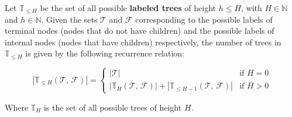   \begin{lemma}
    Let \(\mathbb{T}_{\leq H}\) be the set of all possible \textbf{labeled 
    trees} of height \(h \leq H\), with \(H \in \mathbb{N}\) and \(h \in 
    \mathbb{N}\).
    Given the sets \(\mathcal{T}\) and \(\mathcal{F}\) corresponding to the
    possible labels of terminal nodes (nodes that do not have children) and the 
    possible labels of internal nodes (nodes that have children) respectively,
    the number of trees in \(\mathbb{T}_{\leq H}\) is given by the following
    recurrence relation:

    \begin{equation}
      \label{eq:genetic_programming:representation:cardinality}
      |\mathbb{T}_{\leq H}(\mathcal{T},\, \mathcal{F})| = \begin{cases}
        |\mathcal{T}| 
          & \text{if } H = 0 \\
        |\mathbb{T}_{H}(\mathcal{T},\, \mathcal{F})| 
            + |\mathbb{T}_{\leq H - 1}(\mathcal{T},\, \mathcal{F})|
          & \text{if } H > 0
      \end{cases}
    \end{equation}

    Where \(\mathbb{T}_{H}\) is the set of all possible trees of height \(H\).
  \end{lemma}

